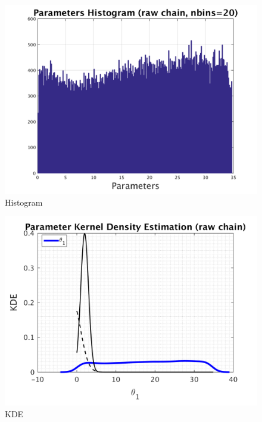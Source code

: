 \begin{figure}[h!]
  
  \centering
   \includegraphics[scale=0.75]{output_100000/simple_ip_hist_raw}
   \caption{Histogram}
\end{figure}



\begin{figure}[h!]
  
  \centering
   \includegraphics[scale=0.75]{output_100000/simple_ip_kde_raw}
   \caption{ KDE }
\end{figure}

